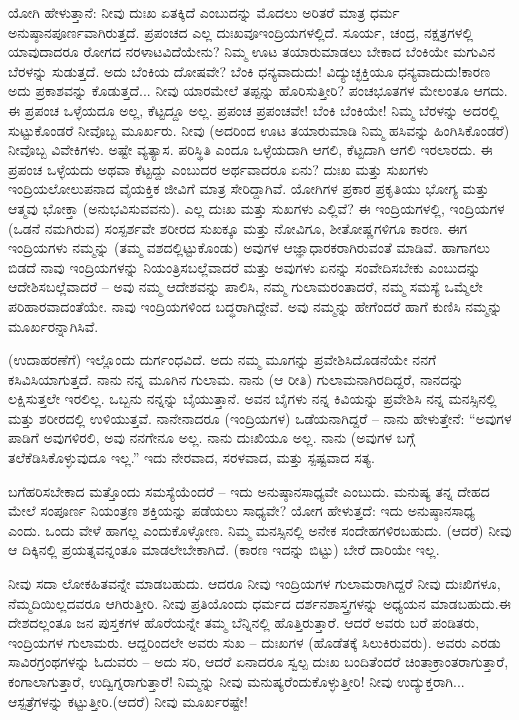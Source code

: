 ಯೋಗಿ ಹೇಳುತ್ತಾನೆ: ನೀವು ದುಃಖ ಏತಕ್ಕಿದೆ ಎಂಬುದನ್ನು ಮೊದಲು ಅರಿತರೆ ಮಾತ್ರ ಧರ್ಮ ಅನುಷ್ಠಾನಪೂರ್ಣವಾಗಿರುತ್ತದೆ. ಪ್ರಪಂಚದ ಎಲ್ಲ ದುಃಖವೂ\break ಇಂದ್ರಿಯಗಳಲ್ಲಿದೆ. ಸೂರ್ಯ, ಚಂದ್ರ, ನಕ್ಷತ್ರಗಳಲ್ಲಿ ಯಾವುದಾದರೂ ರೋಗದ ನರಳಾಟವಿದೆಯೇನು? ನಿಮ್ಮ ಊಟ ತಯಾರುಮಾಡಲು ಬೇಕಾದ ಬೆಂಕಿಯೇ ಮಗುವಿನ ಬೆರಳನ್ನು ಸುಡುತ್ತದೆ. ಅದು ಬೆಂಕಿಯ ದೋಷವೇ? ಬೆಂಕಿ ಧನ್ಯವಾದುದು! ವಿದ್ಯುಚ್ಛಕ್ತಿಯೂ ಧನ್ಯವಾದುದು!ಕಾರಣ ಅದು ಪ್ರಕಾಶವನ್ನು ಕೊಡುತ್ತದೆ... ನೀವು ಯಾರಮೇಲೆ ತಪ್ಪನ್ನು ಹೊರಿಸುತ್ತೀರಿ? ಪಂಚಭೂತಗಳ ಮೇಲಂತೂ ಆಗದು. ಈ ಪ್ರಪಂಚ ಒಳ್ಳೆಯದೂ ಅಲ್ಲ, ಕೆಟ್ಟದ್ದೂ ಅಲ್ಲ. ಪ್ರಪಂಚ ಪ್ರಪಂಚವೇ! ಬೆಂಕಿ ಬೆಂಕಿಯೇ! ನಿಮ್ಮ ಬೆರಳನ್ನು ಅದರಲ್ಲಿ ಸುಟ್ಟುಕೊಂಡರೆ ನೀವೊಬ್ಬ ಮೂರ್ಖರು. ನೀವು (ಅದರಿಂದ ಊಟ ತಯಾರುಮಾಡಿ ನಿಮ್ಮ ಹಸಿವನ್ನು ಹಿಂಗಿಸಿಕೊಂಡರೆ) ನೀವೊಬ್ಬ ವಿವೇಕಿಗಳು. ಅಷ್ಟೇ ವ್ಯತ್ಯಾಸ. ಪರಿಸ್ಥಿತಿ ಎಂದೂ ಒಳ್ಳೆಯದಾಗಿ ಆಗಲಿ, ಕೆಟ್ಟದಾಗಿ ಆಗಲಿ ಇರಲಾರದು. ಈ ಪ್ರಪಂಚ ಒಳ್ಳೆಯದು ಅಥವಾ ಕೆಟ್ಟದ್ದು ಎಂಬುದರ ಅರ್ಥವಾದರೂ ಏನು? ದುಃಖ ಮತ್ತು ಸುಖಗಳು ಇಂದ್ರಿಯಲೋಲುಪನಾದ ವೈಯಕ್ತಿಕ ಜೀವಿಗೆ ಮಾತ್ರ ಸೇರಿದ್ದಾಗಿವೆ. ಯೋಗಿಗಳ ಪ್ರಕಾರ ಪ್ರಕೃತಿಯು ಭೋಗ್ಯ ಮತ್ತು ಆತ್ಮವು ಭೋಕ್ತಾ (ಅನುಭವಿಸುವವನು). ಎಲ್ಲ ದುಃಖ ಮತ್ತು ಸುಖಗಳು ಎಲ್ಲಿವೆ? ಈ ಇಂದ್ರಿಯಗಳಲ್ಲಿ, ಇಂದ್ರಿಯಗಳ (ಒಡನೆ ನಮಗಿರುವ) ಸಂಸ್ಪರ್ಶವೇ ಶರೀರದ ಸುಖಕ್ಕೂ ಮತ್ತು ನೋವಿಗೂ, ಶೀತೋಷ್ಣಗಳಿಗೂ ಕಾರಣ. ಈಗ ಇಂದ್ರಿಯಗಳು ನಮ್ಮನ್ನು (ತಮ್ಮ ವಶದಲ್ಲಿಟ್ಟುಕೊಂಡು) ಅವುಗಳ ಆಜ್ಞಾಧಾರಕರಾಗಿರುವಂತೆ ಮಾಡಿವೆ. ಹಾಗಾಗಲು ಬಿಡದೆ ನಾವು ಇಂದ್ರಿಯಗಳನ್ನು ನಿಯಂತ್ರಿಸಬಲ್ಲೆವಾದರೆ ಮತ್ತು ಅವುಗಳು ಏನನ್ನು ಸಂವೇದಿಸಬೇಕು ಎಂಬುದನ್ನು ಆದೇಶಿಸಬಲ್ಲೆವಾದರೆ – ಅವು ನಮ್ಮ ಆದೇಶವನ್ನು ಪಾಲಿಸಿ, ನಮ್ಮ ಗುಲಾಮರಂತಾದರೆ, ನಮ್ಮ ಸಮಸ್ಯೆ ಒಮ್ಮೆಲೇ ಪರಿಹಾರವಾದಂತೆಯೇ. ನಾವು ಇಂದ್ರಿಯಗಳಿಂದ ಬದ್ಧರಾಗಿದ್ದೇವೆ. ಅವು ನಮ್ಮನ್ನು ಹೇಗೆಂದರೆ ಹಾಗೆ ಕುಣಿಸಿ ನಮ್ಮನ್ನು ಮೂರ್ಖರನ್ನಾಗಿಸಿವೆ.

(ಉದಾಹರಣೆಗೆ) ಇಲ್ಲೊಂದು ದುರ್ಗಂಧವಿದೆ. ಅದು ನಮ್ಮ ಮೂಗನ್ನು ಪ್ರವೇಶಿಸಿದೊಡನೆಯೇ ನನಗೆ ಕಸಿವಿಸಿಯಾಗುತ್ತದೆ. ನಾನು ನನ್ನ ಮೂಗಿನ ಗುಲಾಮ. ನಾನು (ಆ ರೀತಿ) ಗುಲಾಮನಾಗಿರದಿದ್ದರೆ, ನಾನದನ್ನು ಲಕ್ಷಿಸುತ್ತಲೇ ಇರಲಿಲ್ಲ. ಒಬ್ಬನು ನನ್ನನ್ನು ಬೈಯುತ್ತಾನೆ. ಅವನ ಬೈಗಳು ನನ್ನ ಕಿವಿಯನ್ನು ಪ್ರವೇಶಿಸಿ ನನ್ನ ಮನಸ್ಸಿನಲ್ಲಿ ಮತ್ತು ಶರೀರದಲ್ಲಿ ಉಳಿಯುತ್ತವೆ. ನಾನೇನಾದರೂ (ಇಂದ್ರಿಯಗಳ) ಒಡೆಯನಾಗಿದ್ದರೆ – ನಾನು ಹೇಳುತ್ತೇನೆ: “ಅವುಗಳ ಪಾಡಿಗೆ ಅವುಗಳಿರಲಿ, ಅವು ನನಗೇನೂ ಅಲ್ಲ. ನಾನು ದುಃಖಿಯೂ ಅಲ್ಲ. ನಾನು (ಅವುಗಳ ಬಗ್ಗೆ ತಲೆಕೆಡಿಸಿಕೊಳ್ಳುವುದೂ ಇಲ್ಲ.” ಇದು ನೇರವಾದ, ಸರಳವಾದ, ಮತ್ತು ಸ್ಪಷ್ಟವಾದ ಸತ್ಯ.

ಬಗೆಹರಿಸಬೇಕಾದ ಮತ್ತೊಂದು ಸಮಸ್ಯೆಯೆಂದರೆ – ಇದು ಅನುಷ್ಠಾನಸಾಧ್ಯವೇ ಎಂಬುದು. ಮನುಷ್ಯ ತನ್ನ ದೇಹದ ಮೇಲೆ ಸಂಪೂರ್ಣ ನಿಯಂತ್ರಣ ಶಕ್ತಿಯನ್ನು ಪಡೆಯಲು ಸಾಧ್ಯವೇ? ಯೋಗ ಹೇಳುತ್ತದೆ: ಇದು ಅನುಷ್ಠಾನಸಾಧ್ಯ ಎಂದು. ಒಂದು ವೇಳೆ ಹಾಗಲ್ಲ ಎಂದುಕೊಳ್ಳೋಣ. ನಿಮ್ಮ ಮನಸ್ಸಿನಲ್ಲಿ ಅನೇಕ ಸಂದೇಹಗಳಿರಬಹುದು. (ಆದರೆ) ನೀವು ಆ ದಿಕ್ಕಿನಲ್ಲಿ ಪ್ರಯತ್ನವನ್ನಂತೂ ಮಾಡಲೇಬೇಕಾಗಿದೆ. (ಕಾರಣ ಇದನ್ನು ಬಿಟ್ಟು) ಬೇರೆ ದಾರಿಯೇ ಇಲ್ಲ.

ನೀವು ಸದಾ ಲೋಕಹಿತವನ್ನೇ ಮಾಡಬಹುದು. ಆದರೂ ನೀವು ಇಂದ್ರಿಯಗಳ ಗುಲಾಮರಾಗಿದ್ದರೆ ನೀವು ದುಃಖಿಗಳೂ, ನೆಮ್ಮದಿಯಿಲ್ಲದವರೂ ಆಗಿರುತ್ತೀರಿ. ನೀವು ಪ್ರತಿಯೊಂದು ಧರ್ಮದ ದರ್ಶನಶಾಸ್ತ್ರಗಳನ್ನು ಅಧ್ಯಯನ ಮಾಡಬಹುದು.\break ಈ ದೇಶದಲ್ಲಂತೂ ಜನ ಪುಸ್ತಕಗಳ ಹೊರೆಯನ್ನೇ ತಮ್ಮ ಬೆನ್ನಿನಲ್ಲಿ ಹೊತ್ತಿರುತ್ತಾರೆ. ಆದರೆ ಅವರು ಬರೆ ಪಂಡಿತರು, ಇಂದ್ರಿಯಗಳ ಗುಲಾಮರು. ಆದ್ದರಿಂದಲೇ﻿ ಅವರು ಸುಖ – ದುಃಖಗಳ (ಹೊಡೆತಕ್ಕೆ ಸಿಲುಕಿರುವರು). ಅವರು ಎರಡು ಸಾವಿರ\break ಗ್ರಂಥಗಳನ್ನು ಓದುವರು – ಅದು ಸರಿ, ಆದರೆ ಏನಾದರೂ ಸ್ವಲ್ಪ ದುಃಖ ಬಂದಿತೆಂದರೆ ಚಿಂತಾಕ್ರಾಂತರಾಗುತ್ತಾರೆ, ಕಂಗಾಲಾಗುತ್ತಾರೆ, ಉದ್ವಿಗ್ನರಾಗುತ್ತಾರೆ! ನಿಮ್ಮನ್ನು ನೀವು ಮನುಷ್ಯರೆಂದುಕೊಳ್ಳುತ್ತೀರಿ! ನೀವು ಉದ್ಯುಕ್ತರಾಗಿ... ಆಸ್ಪತ್ರೆಗಳನ್ನು ಕಟ್ಟುತ್ತೀರಿ.\break (ಆದರೆ) ನೀವು ಮೂರ್ಖರಷ್ಟೇ!

